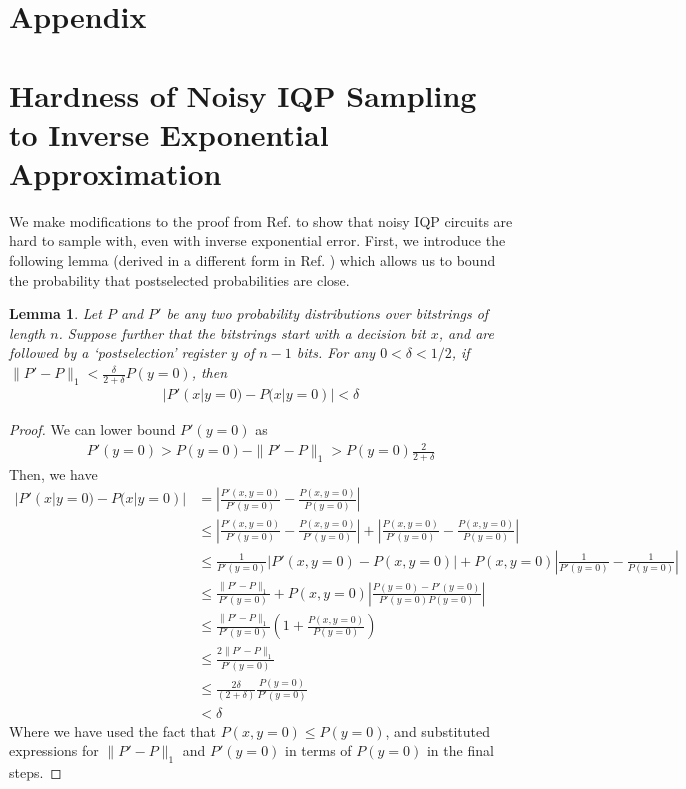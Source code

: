 \documentclass[a4paper,onecolumn,11pt,accepted=2017-05-09]{quantumarticle}
\newcommand{\jw}[1]{\textcolor{purple}{JW: #1}}
\newtheorem{lemma}[theorem]{Lemma}
\begin{document}
		\printbibliography[heading=bibintoc]
	
	\appendix
	\section*{Appendix}
	
	\section{Hardness of Noisy IQP Sampling to Inverse Exponential Approximation} \label{Appendix:Hardness_Exponential}
	We make modifications to the proof from Ref. \cite{fujii2016computational} to show that noisy IQP circuits are hard to sample with, even with inverse exponential error. First, we introduce the following lemma (derived in a different form in Ref. \cite{fujii2016computational}) which allows us to bound the probability that postselected probabilities are close.
	
	\begin{lemma}  \label{Lemma:postselect}
		Let $P$ and $P'$ be any two probability distributions over bitstrings of length $n$. Suppose further that the bitstrings start with a decision bit $x$, and are followed by a `postselection' register $y$ of $n-1$ bits. For any $0 < \delta < 1/2$, if $\|P'-P\|_{1} < \frac{\delta}{2+\delta}P(y=0)$, then
		\begin{align}
			|P'(x|y=0)-P(x|y=0)| <\delta
		\end{align}
	\end{lemma}
	\begin{proof}
		We can lower bound $P'(y=0)$ as 
		\begin{align}
			P'(y=0) > P(y=0)  - \|P'-P\|_{1} > P(y=0)\frac{2}{2+\delta}
		\end{align}
		Then, we have
		\begin{align}
			|P'(x|y=0)-P(x|y=0)| &= \left| \frac{P'(x,y=0)}{P'(y=0)} - \frac{P(x,y=0)}{P(y=0)}\right|\\
			&\leq  \left| \frac{P'(x,y=0)}{P'(y=0)} - \frac{P(x,y=0)}{P'(y=0)}\right| + \left| \frac{P(x,y=0)}{P'(y=0)} -\frac{P(x,y=0)}{P(y=0)} \right| \\
			&\leq  \frac{1}{P'(y=0)}\left| P'(x,y=0) - P(x,y=0)\right| + P(x,y=0)\left| \frac{1}{P'(y=0)} -\frac{1}{P(y=0)} \right| \\
			&\leq  \frac{\|P'-P\|_{1}}{P'(y=0)} + P(x,y=0)\left| \frac{P(y=0)-P'(y=0)}{P'(y=0)P(y=0)}  \right| \\
			&\leq \frac{\|P'-P\|_{1}}{P'(y=0)}\left( 1 +  \frac{P(x,y=0)}{P(y=0)}   \right) \\
			&\leq \frac{2\|P'-P\|_{1}}{P'(y=0)}\\
			&\leq \frac{2\delta }{(2+\delta)}\frac{P(y=0)}{P'(y=0)}\\
			&< \delta
		\end{align}
		Where we have used the fact that $P(x,y=0) \leq P(y=0)$, and substituted expressions for $\|P'-P\|_{1}$ and $P'(y=0)$ in terms of $P(y=0)$ in the final steps.
	\end{proof}
	
\end{document}
